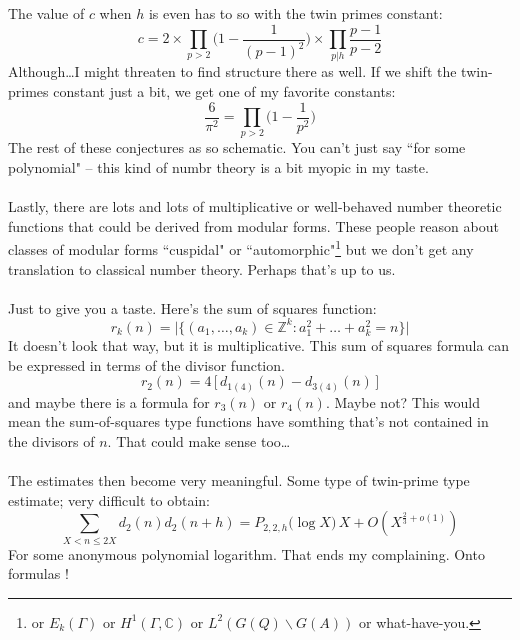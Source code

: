 \documentclass[12pt]{article}
\begin{document}
\newpage

\noindent The value of $c$ when $h$ is even has to so with the twin primes constant:
$$ c = 2 \times \prod_{p > 2} \Big( 1 - \frac{1}{(p-1)^2}\Big) \times \prod_{p | h } \frac{p-1}{p-2}  $$
Although\dots I might threaten to find structure there as well.  If we shift the twin-primes constant just a bit, we get one of my favorite constants:
$$ \frac{6}{\pi^2} = \prod_{p > 2} \Big( 1 - \frac{1}{p^2}\Big)  $$
The rest of these conjectures as so schematic.  You can't just say ``for some polynomial" -- this kind of numbr theory is a bit myopic in my taste.  \\ \\
Lastly, there are lots and lots of multiplicative or well-behaved number theoretic functions that could be derived from modular forms.  These people reason about classes of modular forms ``cuspidal" or ``automorphic"\footnote{ or $E_k(\Gamma)$ or $H^1(\Gamma, \mathbb{C})$ or $L^2(G(Q)\backslash G(A))$ or what-have-you.} but we don't get any translation to classical number theory.  Perhaps that's up to us. \\ \\
Just to give you a taste.  Here's the sum of squares function:
$$ r_k(n) = \big|  \{ (a_1, \dots, a_k) \in \mathbb{Z}^k : a_1^2 + \dots + a_k^2 = n \}  \big|  $$
It doesn't look that way, but it is multiplicative.  This sum of squares formula can be expressed in terms of the divisor function.
$$ r_2(n) = 4 \, \big[ \, d_{1(4)}(n) - d_{3(4)}(n) \, \big] $$ 
and maybe there is a formula for $r_3(n)$ or $r_4(n)$.  Maybe not?  This would mean the sum-of-squares type functions have somthing that's not contained in the divisors of $n$.  That could make sense too\dots \\ \\
The estimates then become very meaningful.  Some type of twin-prime type estimate; very difficult to obtain:
$$\sum_{X < n \leq 2X} d_2(n) d_2(n+h) = P_{2,2,h} \Big( \log X \Big) \, X + O( X^{\frac{2}{3} + o(1)} ) $$
For some anonymous polynomial logarithm.  That ends my complaining.  Onto formulas !

\newpage
\end{document}
